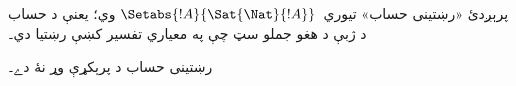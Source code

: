 \documentclass[../../../include/open-logic-section]{subfiles}
\begin{document}
پرېږدئ «رښتينی حساب» تيوري~$\Setabs{!A}{ \Sat{\Nat}{!A}}$ وي؛
يعنې د حساب د ژبې د هغو جملو سټ چې په معياري تفسير کښې رښتيا دي۔

\begin{cor}
رښتينی حساب د پرېکړې وړ نۀ دے۔
\end{cor}

\end{document}
